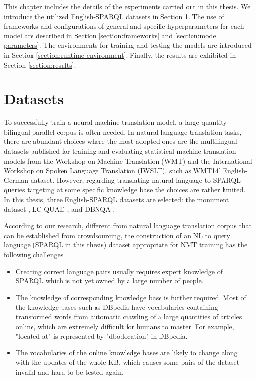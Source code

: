 
This chapter includes the details of the experiments carried out in this thesis. We introduce the utilized English-SPARQL datasets in Section \ref{section:datasets}. The use of frameworks and configurations of general and specific hyperparameters for each model are described in Section \ref{section:frameworks} and \ref{section:model parameters}. The environments for training and testing the models are introduced in Section \ref{section:runtime environment}. Finally, the results are exhibited in Section \ref{section:results}.

\section{Datasets} \label{section:datasets}

To successfully train a neural machine translation model, a large-quantity bilingual parallel corpus is often needed. In natural language translation tasks, there are abundant choices where the most adopted ones are the multilingual datasets published for training and evaluating statistical machine translation models from the Workshop on Machine Translation (WMT) and the International Workshop on Spoken Language Translation (IWSLT), such as WMT14' English-German dataset. However, regarding translating natural language to SPARQL queries targeting at some specific knowledge base the choices are rather limited. In this thesis, three English-SPARQL datasets are selected: the monument dataset \cite{Soru2018a}, LC-QUAD \cite{trivedi2017lc}, and DBNQA \cite{Soru2018dbnqa}.

According to our research, different from natural language translation corpus that can be established from crowdsourcing, the construction of an NL to query language (SPARQL in this thesis) dataset appropriate for NMT training has the following challenges:
\begin{itemize}
\item Creating correct language pairs usually requires expert knowledge of SPARQL which is not yet owned by a large number of people. 
\item The knowledge of corresponding knowledge base is further required. Most of the knowledge bases such as DBpedia have vocabularies containing transformed words from automatic crawling of a large quantities of articles online, which are extremely difficult for humans to master. For example, "located at" is represented by "dbo:location" in DBpedia.
\item The vocabularies of the online knowledge bases are likely to change along with the updates of the whole KB, which causes some pairs of the dataset invalid and hard to be tested again.
\end{itemize}

